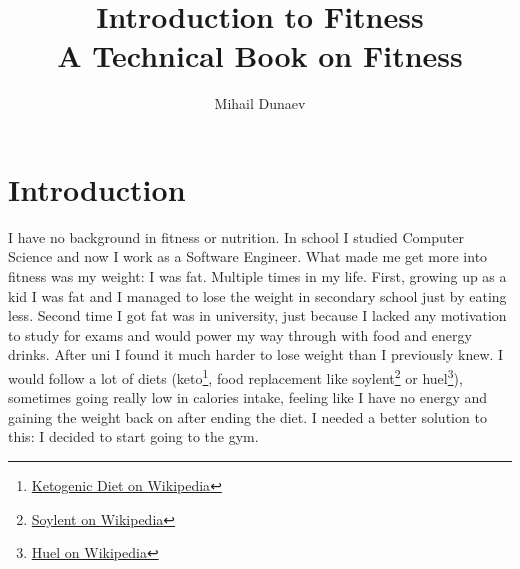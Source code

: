 \documentclass[openany, 12pt]{book}
\title{
  Introduction to Fitness \\
  \vskip 0.5cm
  \small A Technical Book on Fitness}
\author{Mihail Dunaev}
\date{}
\begin{document}
  \maketitle
  \tableofcontents

  \chapter{Introduction}
  
	I have no background in fitness or nutrition. In school I studied Computer Science and now I work as a Software Engineer. What made me get more 
	into fitness was my weight: I was fat. Multiple times in my life. First, growing up as a kid I was fat and I managed to lose the weight in 
	secondary school just by eating less. Second time I got fat was in university, just because I lacked any motivation to study for exams and would
	power my way through with food and energy drinks. After uni I found it much harder to lose weight than I previously knew. I would follow a lot 
	of diets (keto\footnote{\href{https://en.wikipedia.org/wiki/Ketogenic_diet}{Ketogenic Diet on Wikipedia}}, food replacement like 
	soylent\footnote{\href{https://en.wikipedia.org/wiki/Soylent_(meal_replacement)}{Soylent on Wikipedia}} or 
	huel\footnote{\href{https://en.wikipedia.org/wiki/Huel}{Huel on Wikipedia}}), sometimes going really low in calories intake, feeling like I 
	have no energy and gaining the weight back on after ending the diet. I needed a better solution to this: I decided to start going to the gym.
	
\end{document}
